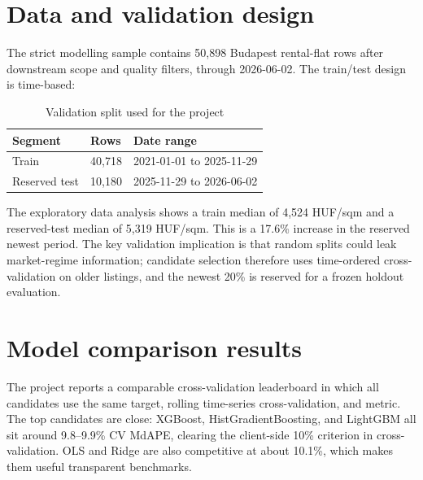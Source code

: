\documentclass[12pt,a4paper]{article}
\begin{document}
\section{Data and validation design}

The strict modelling sample contains 50,898 Budapest rental-flat rows after downstream scope and quality filters, through 2026-06-02. The train/test design is time-based:

\begin{table}[h]
\centering
\caption{Validation split used for the project}
\begin{tabular}{@{}lll@{}}
\toprule
Segment & Rows & Date range \\
\midrule
Train & 40,718 & 2021-01-01 to 2025-11-29 \\
Reserved test & 10,180 & 2025-11-29 to 2026-06-02 \\
\bottomrule
\end{tabular}
\end{table}

The exploratory data analysis shows a train median of 4,524 HUF/sqm and a reserved-test median of 5,319 HUF/sqm. This is a 17.6\% increase in the reserved newest period. The key validation implication is that random splits could leak market-regime information; candidate selection therefore uses time-ordered cross-validation on older listings, and the newest 20\% is reserved for a frozen holdout evaluation.

\section{Model comparison results}

The project reports a comparable cross-validation leaderboard in which all candidates use the same target, rolling time-series cross-validation, and metric. The top candidates are close: XGBoost, HistGradientBoosting, and LightGBM all sit around 9.8--9.9\% CV MdAPE, clearing the client-side 10\% criterion in cross-validation. OLS and Ridge are also competitive at about 10.1\%, which makes them useful transparent benchmarks.
\end{document}
